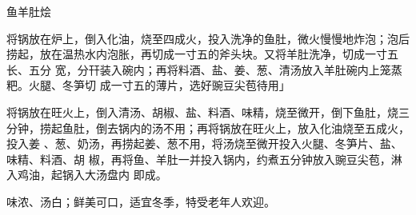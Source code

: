 \begin{recipe}{鱼羊肚烩}

\ingredients


\preparation

\step 将锅放在炉上，倒入化油，烧至四成火，投入洗净的鱼肚，微火慢慢地炸泡；泡后
捞起，放在温热水内泡胀，再切成一寸五的斧头块。又将羊肚洗净，切成一寸五长、五分
宽，分幵装入碗内；再将料酒、盐、姜、葱、清汤放入羊肚碗内上笼蒸粑。火腿、冬笋切
成一寸五的薄片，选好豌豆尖苞待用」

\step 将锅放在旺火上，倒入清汤、胡椒、盐、料酒、味精，烧至微开，倒下鱼肚，烧三
分钟，捞起鱼肚，倒去锅内的汤不用；再将锅放在旺火上，放入化油烧至五成火，投入姜
、葱、奶汤，再捞起姜、葱不用，将汤烧至微开投入火腿、冬笋片、盐、味精、料酒、胡
椒，再将鱼、羊肚一并投入锅内，约煮五分钟放入豌豆尖苞，淋入鸡油，起锅入大汤盘内
即成。

\features

味浓、汤白；鲜美可口，适宜冬季，特受老年人欢迎。

\end{recipe}

